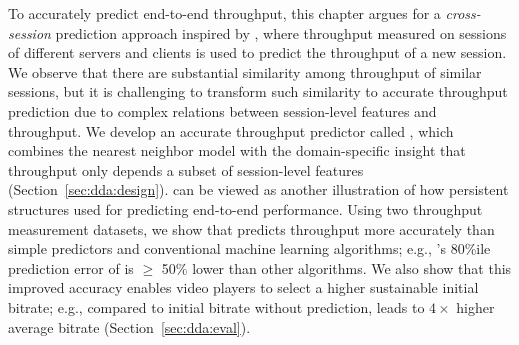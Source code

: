 To accurately predict end-to-end throughput, this chapter 
argues for a {\em cross-session} prediction approach inspired by \ddn, 
where throughput measured on sessions of different servers and clients 
is used to predict the throughput of a new session.
We observe that there are substantial similarity among
throughput of similar sessions, but it is challenging
to transform such similarity to accurate throughput
prediction due to complex relations between session-level features 
and throughput. 
We develop an accurate throughput predictor called \name, which 
combines the nearest neighbor model with the domain-specific 
insight that
throughput only depends a subset of session-level features 
(Section~\ref{sec:dda:design}). \name can be viewed as another illustration 
of how persistent structures used for predicting end-to-end performance.
Using two throughput measurement datasets, we show that \name 
predicts throughput more accurately than simple predictors and 
conventional machine learning algorithms; e.g., \name's 80\%ile 
prediction error of \name is $\geq$ 50\% lower than other algorithms. 
We also show that this 
improved accuracy enables video players to select a higher 
sustainable initial bitrate; e.g., compared to initial bitrate without 
prediction, \name leads to $4\times$ higher average bitrate 
(Section~\ref{sec:dda:eval}).



